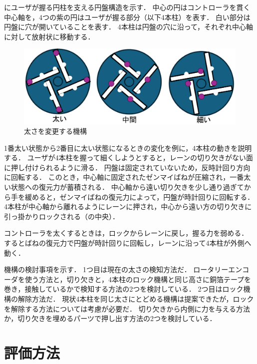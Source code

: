 \documentclass[uplatex]{jsarticle}
\begin{document}
にユーザが握る円柱を支える円盤構造を示す．
中心の円はコントローラを貫く中心軸を，4つの紫の円はユーザが握る部分（以下4本柱）を表す．
白い部分は円盤に穴が開いていることを表す．
4本柱は円盤の穴に沿って，それぞれ中心軸に対して放射状に移動する．

\begin{figure}[htbp]
    \centering
    \includegraphics[width=0.9\linewidth]{fig/太さ3段階.png}
    \caption{太さを変更する機構}
    \label{fig:SlashGear}
\end{figure}

1番太い状態から2番目に太い状態になるときの変化を例に，4本柱の動きを説明する．
ユーザが4本柱を握って細くしようとすると，レーンの切り欠きがない面に押し付けられるように滑る．
円盤は固定されていないため，反時計回り方向に回転する．
このとき，中心軸に固定されたゼンマイばねが圧縮され，一番太い状態への復元力が蓄積される．
中心軸から遠い切り欠きを少し通り過ぎてから手を緩めると，ゼンマイばねの復元力によって，円盤が時計回りに回転する．
4本柱が中心軸から離れるようにレーンに押され，中心から遠い方の切り欠きに引っ掛かりロックされる（の中央）．

コントローラを太くするときは，ロックからレーンに戻し，握る力を弱める．
するとばねの復元力で円盤が時計回りに回転し，レーンに沿って4本柱が外側へ動く．

機構の検討事項を示す．
1つ目は現在の太さの検知方法だ．
ロータリーエンコーダを使う方法と，切り欠きと，4本柱のロック機構と同じ高さに銅箔テープを巻き，接触しているかで検知する方法の2つを検討している．
2つ目はロック機構の解除方法だ．
現状4本柱を同じ太さにとどめる機構は提案できたが，ロックを解除する方法については考慮が必要だ．
切り欠きから内側に力を与える方法か，切り欠きを埋めるパーツで押し出す方法の2つを検討している．


\section{評価方法}
\end{document}
